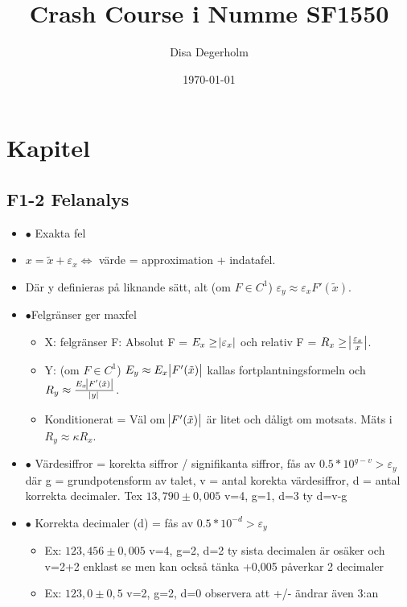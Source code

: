 \documentclass[a4paper]{article}
\title{Crash Course i Numme SF1550}
\author{Disa Degerholm}
\date{\today}
\begin{document}
\makemytitlepage

\section{Kapitel}

\subsection{F1-2 Felanalys}

\begin{itemize}[label={}, leftmargin=1.5em, parsep=0pt, itemsep=0pt]

    \item $\bullet$ Exakta fel
    \item $x=\tilde{x}+\varepsilon_x \Longleftrightarrow$ värde = approximation + indatafel.
    \item Där y definieras på liknande sätt, alt (om $F\in C^1$) $\varepsilon_y \approx \varepsilon_x F'(\tilde{x})$.
    \\
    \item $\bullet$Felgränser ger maxfel
    \begin{itemize}
        \item X: felgränser F: Absolut F = $E_x \geq \abs{\varepsilon_x}$ och relativ F = $R_x \geq \abs{\frac{\varepsilon_x}{x}}$.
        \item Y: (om $F\in C^1$) $E_y \approx E_x \abs{F'(\tilde{x})}$ kallas fortplantningsformeln och $R_y \approx \frac{E_x\abs{F'(\tilde{x})}}{\abs{y}}$.
        \item Konditionerat = Väl om $\abs{F'(\tilde{x})}$ är litet och dåligt om motsats. Mäts i $R_y \approx \kappa R_x$.
        \\
    \end{itemize}
    \item $\bullet$ Värdesiffror = korekta siffror / signifikanta siffror, fås av $0.5 * 10^{g-v} > {\varepsilon_y}$ där g = grundpotensform av talet, v = antal korekta värdesiffror, d = antal korrekta decimaler. Tex $13,790\pm 0,005$ v=4, g=1, d=3 ty d=v-g
    \item $\bullet$ Korrekta decimaler (d) = fås av $0.5 * 10^{-d} > {\varepsilon_y}$
    \begin{itemize}
        \item Ex: $123,456\pm 0,005$ v=4, g=2, d=2 ty sista decimalen är osäker och v=2+2 enklast se men kan också tänka +0,005 påverkar 2 decimaler
        \item Ex: $123,0\pm 0,5$ v=2, g=2, d=0 observera att +/- ändrar även 3:an

\end{itemize}
\end{itemize}
\end{document}
